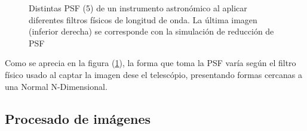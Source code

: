 \begin{enumerate}
\begin{figure}[!htb]
    		\caption{\label{fig:psfInfrared}{\small Distintas PSF (5) de un instrumento astronómico al aplicar diferentes filtros físicos de longitud de onda. La última imagen (inferior derecha) se corresponde con la simulación de reducción de PSF}}
    	\end{figure}
	Como se aprecia en la figura (\ref{fig:psfInfrared}), la forma que toma la PSF varía según el filtro físico usado al captar la imagen dese el telescópio, presentando formas cercanas a una Normal N-Dimensional.

	\end{enumerate}
	\clearpage
	\subsection{Procesado de imágenes}
